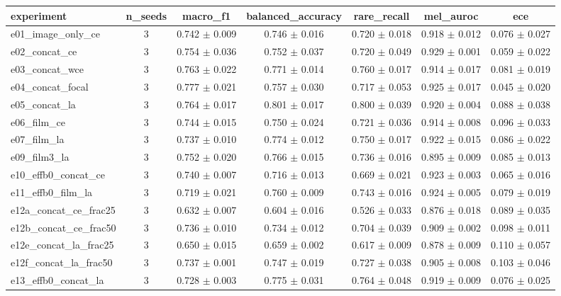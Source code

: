 \begin{tabular}{lcccccc}
\toprule
experiment & n\_seeds & macro\_f1 & balanced\_accuracy & rare\_recall & mel\_auroc & ece \\
\midrule
e01\_image\_only\_ce & 3 & 0.742 $\pm$ 0.009 & 0.746 $\pm$ 0.016 & 0.720 $\pm$ 0.018 & 0.918 $\pm$ 0.012 & 0.076 $\pm$ 0.027 \\
e02\_concat\_ce & 3 & 0.754 $\pm$ 0.036 & 0.752 $\pm$ 0.037 & 0.720 $\pm$ 0.049 & 0.929 $\pm$ 0.001 & 0.059 $\pm$ 0.022 \\
e03\_concat\_wce & 3 & 0.763 $\pm$ 0.022 & 0.771 $\pm$ 0.014 & 0.760 $\pm$ 0.017 & 0.914 $\pm$ 0.017 & 0.081 $\pm$ 0.019 \\
e04\_concat\_focal & 3 & 0.777 $\pm$ 0.021 & 0.757 $\pm$ 0.030 & 0.717 $\pm$ 0.053 & 0.925 $\pm$ 0.017 & 0.045 $\pm$ 0.020 \\
e05\_concat\_la & 3 & 0.764 $\pm$ 0.017 & 0.801 $\pm$ 0.017 & 0.800 $\pm$ 0.039 & 0.920 $\pm$ 0.004 & 0.088 $\pm$ 0.038 \\
e06\_film\_ce & 3 & 0.744 $\pm$ 0.015 & 0.750 $\pm$ 0.024 & 0.721 $\pm$ 0.036 & 0.914 $\pm$ 0.008 & 0.096 $\pm$ 0.033 \\
e07\_film\_la & 3 & 0.737 $\pm$ 0.010 & 0.774 $\pm$ 0.012 & 0.750 $\pm$ 0.017 & 0.922 $\pm$ 0.015 & 0.086 $\pm$ 0.022 \\
e09\_film3\_la & 3 & 0.752 $\pm$ 0.020 & 0.766 $\pm$ 0.015 & 0.736 $\pm$ 0.016 & 0.895 $\pm$ 0.009 & 0.085 $\pm$ 0.013 \\
e10\_effb0\_concat\_ce & 3 & 0.740 $\pm$ 0.007 & 0.716 $\pm$ 0.013 & 0.669 $\pm$ 0.021 & 0.923 $\pm$ 0.003 & 0.065 $\pm$ 0.016 \\
e11\_effb0\_film\_la & 3 & 0.719 $\pm$ 0.021 & 0.760 $\pm$ 0.009 & 0.743 $\pm$ 0.016 & 0.924 $\pm$ 0.005 & 0.079 $\pm$ 0.019 \\
e12a\_concat\_ce\_frac25 & 3 & 0.632 $\pm$ 0.007 & 0.604 $\pm$ 0.016 & 0.526 $\pm$ 0.033 & 0.876 $\pm$ 0.018 & 0.089 $\pm$ 0.035 \\
e12b\_concat\_ce\_frac50 & 3 & 0.736 $\pm$ 0.010 & 0.734 $\pm$ 0.012 & 0.704 $\pm$ 0.039 & 0.909 $\pm$ 0.002 & 0.098 $\pm$ 0.011 \\
e12e\_concat\_la\_frac25 & 3 & 0.650 $\pm$ 0.015 & 0.659 $\pm$ 0.002 & 0.617 $\pm$ 0.009 & 0.878 $\pm$ 0.009 & 0.110 $\pm$ 0.057 \\
e12f\_concat\_la\_frac50 & 3 & 0.737 $\pm$ 0.001 & 0.747 $\pm$ 0.019 & 0.727 $\pm$ 0.038 & 0.905 $\pm$ 0.008 & 0.103 $\pm$ 0.046 \\
e13\_effb0\_concat\_la & 3 & 0.728 $\pm$ 0.003 & 0.775 $\pm$ 0.031 & 0.764 $\pm$ 0.048 & 0.919 $\pm$ 0.009 & 0.076 $\pm$ 0.025 \\
\bottomrule
\end{tabular}
